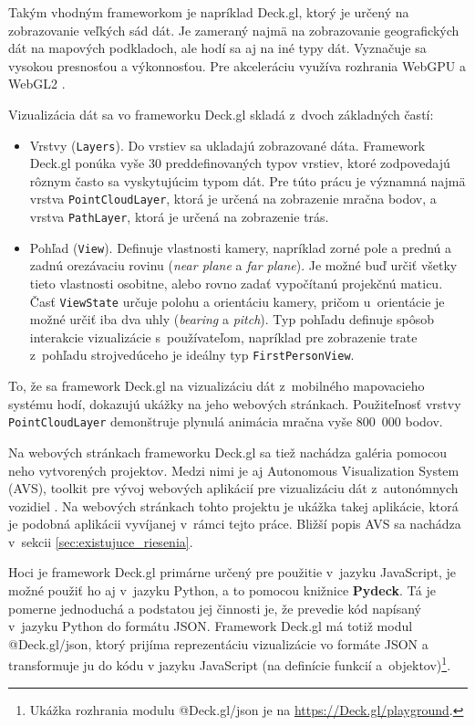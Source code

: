 Takým vhodným frameworkom je napríklad Deck.gl, ktorý je určený na zobrazovanie veľkých sád dát. Je zameraný najmä na zobrazovanie geografických dát na mapových podkladoch, ale hodí sa aj na iné typy dát. Vyznačuje sa vysokou presnosťou a výkonnosťou. Pre akceleráciu využíva rozhrania WebGPU a WebGL2 \cite{deck.gl_documentation}.

Vizualizácia dát sa vo frameworku Deck.gl skladá z~dvoch základných častí:
\begin{itemize}
    \item Vrstvy (\texttt{Layers}). Do vrstiev sa ukladajú zobrazované dáta. Framework Deck.gl ponúka vyše 30 preddefinovaných typov vrstiev, ktoré zodpovedajú rôznym často sa vyskytujúcim typom dát. Pre túto prácu je významná najmä vrstva \texttt{PointCloudLayer}, ktorá je určená na zobrazenie mračna bodov, a vrstva \texttt{PathLayer}, ktorá je určená na zobrazenie trás.
    \item Pohľad (\texttt{View}). Definuje vlastnosti kamery, napríklad zorné pole a prednú a zadnú orezávaciu rovinu (\emph{near plane} a \emph{far plane}). Je možné buď určiť všetky tieto vlastnosti osobitne, alebo rovno zadať vypočítanú projekčnú maticu.
    Časť \texttt{ViewState} určuje polohu a orientáciu kamery, pričom u~orientácie je možné určiť iba dva uhly (\emph{bearing} a \emph{pitch}). Typ pohľadu definuje spôsob interakcie vizualizácie s~používateľom, napríklad pre zobrazenie trate z~pohľadu strojvedúceho je ideálny typ \texttt{FirstPersonView}.
\end{itemize}

To, že sa framework Deck.gl na vizualizáciu dát z~mobilného mapovacieho systému hodí, dokazujú ukážky na jeho webových stránkach. Použiteľnosť vrstvy \texttt{PointCloudLayer} demonštruje plynulá animácia mračna vyše 800~000 bodov.

Na webových stránkach frameworku Deck.gl sa tiež nachádza galéria pomocou neho vytvorených projektov. Medzi nimi je aj Autonomous Visualization System (AVS), toolkit pre vývoj webových aplikácií pre vizualizáciu dát z~autonómnych vozidiel \cite{avs}. Na webových stránkach tohto projektu je ukážka takej aplikácie, ktorá je podobná aplikácii vyvíjanej v~rámci tejto práce. Bližší popis AVS sa nachádza v~sekcii \ref{sec:existujuce_riesenia}.

Hoci je framework Deck.gl primárne určený pre použitie v~jazyku JavaScript, je možné použiť ho aj v~jazyku Python, a to pomocou knižnice \textbf{Pydeck}. Tá je pomerne jednoduchá a podstatou jej činnosti je, že prevedie kód napísaný v~jazyku Python do formátu JSON. Framework Deck.gl má totiž modul @Deck.gl/json, ktorý prijíma reprezentáciu vizualizácie vo formáte JSON a transformuje ju do kódu v jazyku JavaScript (na definície funkcií a~objektov)\footnote{Ukážka rozhrania modulu @Deck.gl/json je na \url{https://Deck.gl/playground}.}.

